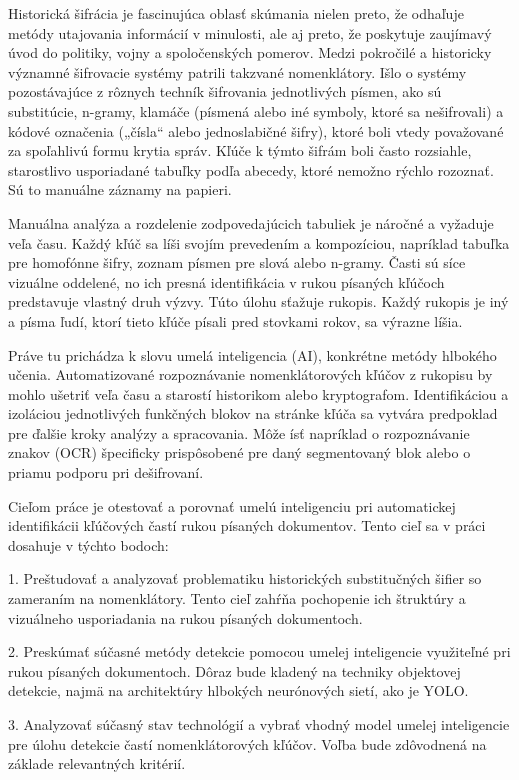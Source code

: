 
Historická šifrácia je fascinujúca oblasť skúmania nielen preto, že odhaľuje metódy utajovania informácií v minulosti, ale aj preto, že poskytuje zaujímavý úvod do politiky, vojny a spoločenských pomerov. Medzi pokročilé a historicky významné šifrovacie systémy patrili takzvané nomenklátory. Išlo o systémy pozostávajúce z rôznych techník šifrovania jednotlivých písmen, ako sú substitúcie, n-gramy, klamáče (písmená alebo iné symboly, ktoré sa nešifrovali) a kódové označenia („čísla“ alebo jednoslabičné šifry), ktoré boli vtedy považované za spoľahlivú formu krytia správ. Kľúče k týmto šifrám boli často rozsiahle, starostlivo usporiadané tabuľky podľa abecedy, ktoré nemožno rýchlo rozoznať. Sú to manuálne záznamy na papieri.

Manuálna analýza a rozdelenie zodpovedajúcich tabuliek je náročné a vyžaduje veľa času. Každý kľúč sa líši svojím prevedením a kompozíciou, napríklad tabuľka pre homofónne šifry, zoznam písmen pre slová alebo n-gramy. Časti sú síce vizuálne oddelené, no ich presná identifikácia v rukou písaných kľúčoch predstavuje vlastný druh výzvy. Túto úlohu sťažuje rukopis. Každý rukopis je iný a písma ľudí, ktorí tieto kľúče písali pred stovkami rokov, sa výrazne líšia.

Práve tu prichádza k slovu umelá inteligencia (AI), konkrétne metódy hlbokého učenia. Automatizované rozpoznávanie nomenklátorových kľúčov z rukopisu by mohlo ušetriť veľa času a starostí historikom alebo kryptografom. Identifikáciou a izoláciou jednotlivých funkčných blokov na stránke kľúča sa vytvára predpoklad pre ďalšie kroky analýzy a spracovania. Môže ísť napríklad o rozpoznávanie znakov (OCR) špecificky prispôsobené pre daný segmentovaný blok alebo o priamu podporu pri dešifrovaní.

Cieľom práce je otestovať a porovnať umelú inteligenciu pri automatickej identifikácii kľúčových častí rukou písaných dokumentov. Tento cieľ sa v práci dosahuje v týchto bodoch:

1. Preštudovať a analyzovať problematiku historických substitučných šifier so zameraním na nomenklátory. Tento cieľ zahŕňa pochopenie ich štruktúry a vizuálneho usporiadania na rukou písaných dokumentoch.

2. Preskúmať súčasné metódy detekcie pomocou umelej inteligencie využiteľné pri rukou písaných dokumentoch. Dôraz bude kladený na techniky objektovej detekcie, najmä na architektúry hlbokých neurónových sietí, ako je YOLO. 

3. Analyzovať súčasný stav technológií a vybrať vhodný model umelej inteligencie pre úlohu detekcie častí nomenklátorových kľúčov. Voľba bude zdôvodnená na základe relevantných kritérií. 

